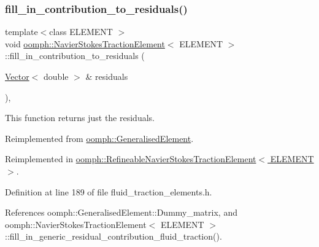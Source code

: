 \subsubsection{\texorpdfstring{fill\+\_\+in\+\_\+contribution\+\_\+to\+\_\+residuals()}{fill\_in\_contribution\_to\_residuals()}}
{\footnotesize\ttfamily template$<$class E\+L\+E\+M\+E\+NT $>$ \\
void \hyperlink{classoomph_1_1NavierStokesTractionElement}{oomph\+::\+Navier\+Stokes\+Traction\+Element}$<$ E\+L\+E\+M\+E\+NT $>$\+::fill\+\_\+in\+\_\+contribution\+\_\+to\+\_\+residuals (\begin{DoxyParamCaption}\item[{\hyperlink{classoomph_1_1Vector}{Vector}$<$ double $>$ \&}]{residuals }\end{DoxyParamCaption})\hspace{0.3cm}{\ttfamily [inline]}, {\ttfamily [virtual]}}



This function returns just the residuals. 



Reimplemented from \hyperlink{classoomph_1_1GeneralisedElement_a310c97f515e8504a48179c0e72c550d7}{oomph\+::\+Generalised\+Element}.



Reimplemented in \hyperlink{classoomph_1_1RefineableNavierStokesTractionElement_a994d2a7986cd7802f9062de227bf9481}{oomph\+::\+Refineable\+Navier\+Stokes\+Traction\+Element$<$ E\+L\+E\+M\+E\+N\+T $>$}.



Definition at line 189 of file fluid\+\_\+traction\+\_\+elements.\+h.



References oomph\+::\+Generalised\+Element\+::\+Dummy\+\_\+matrix, and oomph\+::\+Navier\+Stokes\+Traction\+Element$<$ E\+L\+E\+M\+E\+N\+T $>$\+::fill\+\_\+in\+\_\+generic\+\_\+residual\+\_\+contribution\+\_\+fluid\+\_\+traction().

\mbox{\label{classoomph_1_1NavierStokesTractionElement_a7c28b510ac27af92bae51f521cec5890}} 
